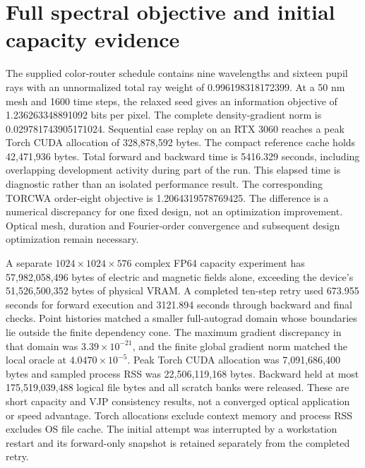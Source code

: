 \documentclass[11pt,a4paper]{article}
\begin{document}
\section{Full spectral objective and initial capacity evidence}
The supplied color-router schedule contains nine wavelengths and sixteen
pupil rays with an unnormalized total ray weight of 0.996198318172399.
At a 50 nm mesh and 1600 time steps, the relaxed seed gives an information
objective of 1.236263348891092 bits per pixel. The complete density-gradient
norm is 0.029781743905171024. Sequential case replay on an RTX 3060 reaches
a peak Torch CUDA allocation of 328,878,592 bytes. The compact reference
cache holds 42,471,936 bytes. Total forward and backward time is 5416.329
seconds, including overlapping development activity during part of the run.
This elapsed time is diagnostic rather than an isolated performance result.
The corresponding TORCWA order-eight objective is 1.2064319578769425.
The difference is a numerical discrepancy for one fixed design, not an
optimization improvement. Optical mesh, duration and Fourier-order convergence
and subsequent design optimization remain necessary.

A separate $1024\times1024\times576$ complex FP64 capacity experiment has
57,982,058,496 bytes of electric and magnetic fields alone, exceeding the
device's 51,526,500,352 bytes of physical VRAM. A completed ten-step retry used
673.955 seconds for forward execution and 3121.894 seconds through backward
and final checks. Point histories matched a smaller full-autograd domain
whose boundaries lie outside the finite dependency cone. The maximum gradient
discrepancy in that domain was $3.39\times10^{-21}$, and the finite global
gradient norm matched the local oracle at $4.0470\times10^{-5}$.
Peak Torch CUDA allocation was 7,091,686,400 bytes and sampled process RSS
was 22,506,119,168 bytes. Backward held at most 175,519,039,488 logical file
bytes and all scratch banks were released. These are short capacity and VJP
consistency results, not a converged optical application or speed advantage.
Torch allocations exclude context memory and process RSS excludes OS file
cache. The initial attempt was interrupted by a workstation restart and its
forward-only snapshot is retained separately from the completed retry.
\end{document}
